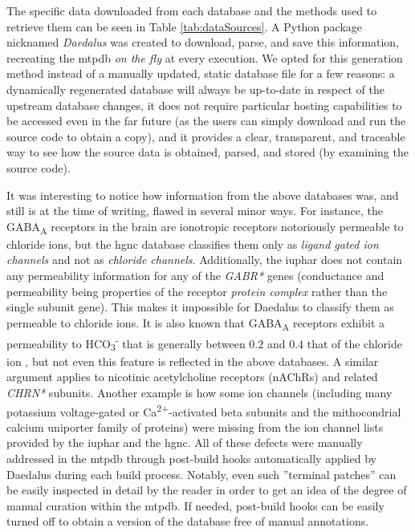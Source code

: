 The specific data downloaded from each database and the methods used to retrieve
them can be seen in Table \ref{tab:dataSources}. A Python package nicknamed
\textit{Daedalus} was created to download, parse, and save this information,
recreating the \gls{mtpdb} \textit{on the fly} at every execution. We opted for
this generation method instead of a manually updated, static database file for a
few reasons: a dynamically regenerated database will always be up-to-date in
respect of the upstream database changes, it does not require particular hosting
capabilities to be accessed even in the far future (as the users can simply
download and run the source code to obtain a copy), and it provides a clear,
transparent, and traceable way to see how the source data is obtained, parsed,
and stored (by examining the source code).

It was interesting to notice how information from the above databases was, and
still is at the time of writing, flawed in several minor ways. For instance, the
GABA\textsubscript{A} receptors in the brain are ionotropic receptors notoriously permeable to chloride ions, but
the \gls{hgnc} database classifies them only as \textit{ligand gated ion channels} and not as \textit{chloride channels}.
Additionally, the \gls{iuphar} does not contain any permeability information for
any of the \textit{GABR*} genes (conductance and permeability being properties of the receptor \textit{protein complex} rather than the single subunit gene). This makes it impossible for Daedalus to classify them as permeable
to chloride ions.
It is also known that GABA\textsubscript{A} receptors exhibit a 
permeability to HCO\textsubscript{3}\textsuperscript{-} that is generally between $0.2$ and $0.4$
that of the chloride ion \cite{goetzGABAAReceptors2007}, but not even this feature is reflected in the above databases.
A similar argument applies to nicotinic acetylcholine receptors (nAChRs) and related \textit{CHRN*} subunits.
Another example is how some ion channels (including many potassium voltage-gated or Ca\textsuperscript{2+}-activated beta subunits and the mithocondrial calcium
uniporter family of proteins) were missing from the ion channel lists provided
by the \gls{iuphar} and the \gls{hgnc}.
All of these defects were manually addressed in the \gls{mtpdb} through
post-build hooks automatically applied by Daedalus during each build process.
Notably, even such ''terminal patches'' can be easily inspected in detail by the
reader in order to get an idea of the degree of manual curation within the
\gls{mtpdb}. If needed, post-build hooks can be easily turned off to obtain a
version of the database free of manual annotations.

